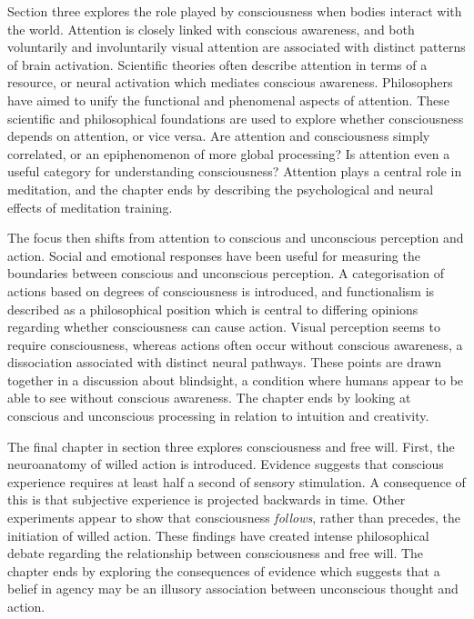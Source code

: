\documentclass[a4paper]{article}
\begin{document}
Section three explores the role played by consciousness when bodies interact
with the world. Attention is closely linked with conscious awareness, and both
voluntarily and involuntarily visual attention are associated with distinct
patterns of brain activation. Scientific theories often describe attention in
terms of a resource, or neural activation which mediates conscious awareness.
Philosophers have aimed to unify the functional and phenomenal aspects of
attention. These scientific and philosophical foundations are used to explore
whether consciousness depends on attention, or vice versa. Are attention and
consciousness simply correlated, or an epiphenomenon of more global
processing? Is attention even a useful category for understanding
consciousness? Attention plays a central role in meditation, and the chapter
ends by describing the psychological and neural effects of meditation
training.

The focus then shifts from attention to conscious and unconscious perception
and action. Social and emotional responses have been useful for measuring the
boundaries between conscious and unconscious perception. A categorisation of
actions based on degrees of consciousness is introduced, and functionalism is
described as a philosophical position which is central to differing opinions
regarding whether consciousness can cause action. Visual perception seems to
require consciousness, whereas actions often occur without conscious
awareness, a dissociation associated with distinct neural pathways. These
points are drawn together in a discussion about blindsight, a condition where
humans appear to be able to see without conscious awareness. The chapter ends
by looking at conscious and unconscious processing in relation to intuition
and creativity.

The final chapter in section three explores consciousness and free will.
First, the neuroanatomy of willed action is introduced. Evidence suggests that
conscious experience requires at least half a second of sensory stimulation. A
consequence of this is that subjective experience is projected backwards in
time. Other experiments appear to show that consciousness \textit{follows},
rather than precedes, the initiation of willed action. These findings have
created intense philosophical debate regarding the relationship between
consciousness and free will. The chapter ends by exploring the consequences of
evidence which suggests that a belief in agency may be an illusory association
between unconscious thought and action.
\end{document}
